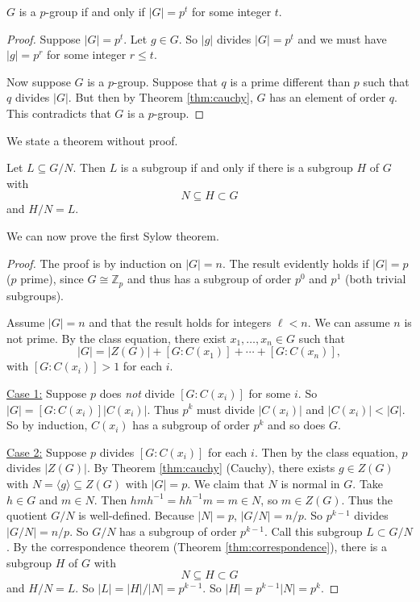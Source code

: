 \begin{corollary}
	$G$ is a $p$-group if and only if $|G|=p^t$ for some integer $t$.
\end{corollary}

\begin{proof}
	Suppose $|G|=p^t$. Let $g\in G$. So $|g|$ divides $|G|=p^t$ and we must have $|g|=p^r$ for some integer $r\leq t$.

	Now suppose $G$ is a $p$-group. Suppose that $q$ is a prime different than $p$ such that $q$ divides $|G|$. But then by Theorem \ref{thm:cauchy}, $G$ has an element of order $q$. This contradicts that $G$ is a $p$-group. 
\end{proof}

We state a theorem without proof.

\begin{theorem}\label{thm:correspondence}
	Let $L\subseteq G/N$. Then $L$ is a subgroup if and only if there is a subgroup $H$ of $G$ with
	$$N\subseteq H\subset G$$
	and $H/N=L$.
\end{theorem}

We can now prove the first Sylow theorem.

\begin{proof}
	The proof is by induction on $|G|=n$. The result evidently holds if $|G|=p$ ($p$ prime), since $G\cong\mathbb Z_{p}$ and thus has a subgroup of order $p^0$ and $p^1$ (both trivial subgroups).

	Assume $|G|=n$ and that the result holds for integers $\ell<n$. We can assume $n$ is not prime. By the class equation, there exist $x_1,\hdots,x_n\in G$ such that
	$$|G|=|Z(G)|+[G:C(x_1)]+\cdots+[G:C(x_n)],$$
	with $[G:C(x_i)]>1$ for each $i$.

	\underline{Case 1:} Suppose $p$ does \textit{not} divide $[G:C(x_i)]$ for some $i$. So $|G|=[G:C(x_i)]|C(x_i)|$. Thus $p^k$ must divide $|C(x_i)|$ and $|C(x_i)|<|G|$. So by induction, $C(x_i)$ has a subgroup of order $p^k$ and so does $G$.

	\underline{Case 2:} Suppose $p$ divides $[G:C(x_i)]$ for each $i$. Then by the class equation, $p$ divides $|Z(G)|$. By Theorem \ref{thm:cauchy} (Cauchy), there exists $g\in Z(G)$ with $N=\langle g\rangle\subseteq Z(G)$ with $|G|=p$. We claim that $N$ is normal in $G$. Take $h\in G$ and $m\in N$. Then $hmh^{-1}=hh^{-1}m=m\in N$, so $m\in Z(G)$. Thus the quotient $G/N$ is well-defined. Because $|N|=p$, $|G/N|=n/p$. So $p^{k-1}$ divides $|G/N|=n/p$. So $G/N$ has a subgroup of order $p^{k-1}$. Call this subgroup $L\subset G/N$. By the correspondence theorem (Theorem \ref{thm:correspondence}), there is a subgroup $H$ of $G$ with
	$$N\subseteq H\subset G$$
	and $H/N=L$. So $|L|=|H|/|N|=p^{k-1}$. So $|H|=p^{k-1}|N|=p^k$.
\end{proof}


